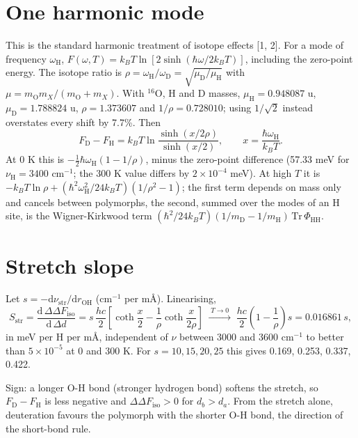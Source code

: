 \documentclass[11pt,a4paper]{article}
\begin{document}
\section{One harmonic mode}
This is the standard harmonic treatment of isotope effects [1, 2]. For a mode of frequency $\omega_{\mathrm H}$, $F(\omega,T) = k_BT \ln[2\sinh(\hbar\omega/2k_BT)]$, including the zero-point energy. The isotope ratio is $\rho = \omega_{\mathrm H}/\omega_{\mathrm D} = \sqrt{\mu_{\mathrm D}/\mu_{\mathrm H}}$ with $\mu = m_{\mathrm O} m_X/(m_{\mathrm O} + m_X)$. With $^{16}$O, H and D masses, $\mu_{\mathrm H} = 0.948087$ u, $\mu_{\mathrm D} = 1.788824$ u, $\rho = 1.373607$ and $1/\rho = 0.728010$; using $1/\sqrt2$ instead overstates every shift by 7.7\%. Then
\begin{equation}
F_{\mathrm D} - F_{\mathrm H} = k_BT \ln\frac{\sinh(x/2\rho)}{\sinh(x/2)}, \qquad x = \frac{\hbar\omega_{\mathrm H}}{k_BT}.
\end{equation}
At 0 K this is $-\tfrac12\hbar\omega_{\mathrm H}(1-1/\rho)$, minus the zero-point difference (57.33 meV for $\nu_{\mathrm H} = 3400$ cm$^{-1}$; the 300 K value differs by $2\times10^{-4}$ meV). At high $T$ it is $-k_BT\ln\rho + (\hbar^2\omega_{\mathrm H}^2/24k_BT)(1/\rho^2 - 1)$; the first term depends on mass only and cancels between polymorphs, the second, summed over the modes of an H site, is the Wigner-Kirkwood term $(\hbar^2/24k_BT)(1/m_{\mathrm D} - 1/m_{\mathrm H})\,\mathrm{Tr}\,\Phi_{\mathrm{HH}}$.

\section{Stretch slope}
Let $s = -\mathrm d\nu_{\mathrm{str}}/\mathrm d r_{\mathrm{OH}}$ (cm$^{-1}$ per m\AA). Linearising,
\begin{equation}
S_{\mathrm{str}} = \frac{\mathrm d\,\Delta\Delta F_{\mathrm{iso}}}{\mathrm d\,\Delta d} = s\,\frac{hc}{2}\left[\coth\frac{x}{2} - \frac1\rho\coth\frac{x}{2\rho}\right] \;\xrightarrow{\;T\to0\;}\; \frac{hc}{2}\left(1-\frac1\rho\right)s = 0.016861\,s,
\end{equation}
in meV per H per m\AA, independent of $\nu$ between 3000 and 3600 cm$^{-1}$ to better than $5\times10^{-5}$ at 0 and 300 K. For $s = 10, 15, 20, 25$ this gives 0.169, 0.253, 0.337, 0.422.

Sign: a longer O-H bond (stronger hydrogen bond) softens the stretch, so $F_{\mathrm D} - F_{\mathrm H}$ is less negative and $\Delta\Delta F_{\mathrm{iso}} > 0$ for $d_b > d_a$. From the stretch alone, deuteration favours the polymorph with the shorter O-H bond, the direction of the short-bond rule.
\end{document}
